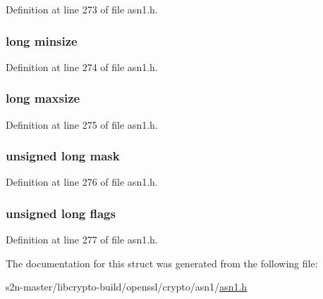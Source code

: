 Definition at line 273 of file asn1.\+h.

\subsubsection[{\texorpdfstring{minsize}{minsize}}]{\setlength{\rightskip}{0pt plus 5cm}long minsize}\hypertarget{structasn1__string__table__st_ac00d3c1a11701202e6df2849c21ad306}{}\label{structasn1__string__table__st_ac00d3c1a11701202e6df2849c21ad306}


Definition at line 274 of file asn1.\+h.

\subsubsection[{\texorpdfstring{maxsize}{maxsize}}]{\setlength{\rightskip}{0pt plus 5cm}long maxsize}\hypertarget{structasn1__string__table__st_a811e84ce3e3798025f4bfe5e44fa93dd}{}\label{structasn1__string__table__st_a811e84ce3e3798025f4bfe5e44fa93dd}


Definition at line 275 of file asn1.\+h.

\subsubsection[{\texorpdfstring{mask}{mask}}]{\setlength{\rightskip}{0pt plus 5cm}unsigned long mask}\hypertarget{structasn1__string__table__st_a5f12360f0fe15618db830b77200ac05d}{}\label{structasn1__string__table__st_a5f12360f0fe15618db830b77200ac05d}


Definition at line 276 of file asn1.\+h.

\subsubsection[{\texorpdfstring{flags}{flags}}]{\setlength{\rightskip}{0pt plus 5cm}unsigned long flags}\hypertarget{structasn1__string__table__st_a9e339c2784bd040b26a5112866700bff}{}\label{structasn1__string__table__st_a9e339c2784bd040b26a5112866700bff}


Definition at line 277 of file asn1.\+h.



The documentation for this struct was generated from the following file\+:\begin{DoxyCompactItemize}
\item 
s2n-\/master/libcrypto-\/build/openssl/crypto/asn1/\hyperlink{crypto_2asn1_2asn1_8h}{asn1.\+h}\end{DoxyCompactItemize}
